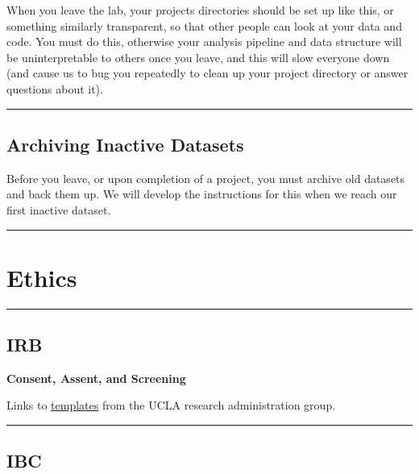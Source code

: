 \documentclass[]{book}
\begin{document}
When you leave the lab, your projects directories should be set up like this, or something similarly transparent, so that other people can look at your data and code. You must do this, otherwise your analysis pipeline and data structure will be uninterpretable to others once you leave, and this will slow everyone down (and cause us to bug you repeatedly to clean up your project directory or answer questions about it).

\begin{center}\rule{0.5\linewidth}{0.5pt}\end{center}

\hypertarget{archiving-inactive-datasets}{%
\subsection{Archiving Inactive Datasets}\label{archiving-inactive-datasets}}

Before you leave, or upon completion of a project, you must archive old datasets and back them up. We will develop the instructions for this when we reach our first inactive dataset.

\begin{center}\rule{0.5\linewidth}{0.5pt}\end{center}

\hypertarget{ethics}{%
\section{Ethics}\label{ethics}}

\begin{center}\rule{0.5\linewidth}{0.5pt}\end{center}

\hypertarget{irb}{%
\subsection{IRB}\label{irb}}

\textbf{Consent, Assent, and Screening}

Links to \href{https://ohrpp.research.ucla.edu/consent-templates/}{templates} from the UCLA research administration group.

\begin{center}\rule{0.5\linewidth}{0.5pt}\end{center}

\hypertarget{ibc}{%
\subsection{IBC}\label{ibc}}
\end{document}
